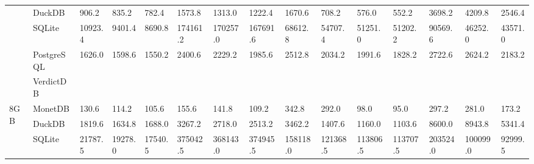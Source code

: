 \begin{table}[]
\begin{tabular}{ll|lllllllllllll}
                     & DuckDB     & 906.2                   & 835.2                   & 782.4                   & 1573.8                  & 1313.0                  & 1222.4                  & 1670.6                  & 708.2                   & 576.0                   & 552.2                   & 3698.2                  & 4209.8                  & 2546.4                  \\
                     & SQLite     & 10923.4                 & 9401.4                  & 8690.8                  & 174161.2                & 170257.0                & 167691.6                & 68612.8                 & 54707.4                 & 51251.0                 & 51202.2                 & 90569.6                 & 46252.0                 & 43571.0                 \\
                     & PostgreSQL & 1626.0                  & 1598.6                  & 1550.2                  & 2400.6                  & 2229.2                  & 1985.6                  & 2512.8                  & 2034.2                  & 1991.6                  & 1828.2                  & 2722.6                  & 2624.2                  & 2183.2                  \\
                     & VerdictDB  &                         &                         &                         &                         &                         &                         &                         &                         &                         &                         &                         &                         &                         \\ \hline
\multirow{5}{*}{8GB} & MonetDB    & 130.6                   & 114.2                   & 105.6                   & 155.6                   & 141.8                   & 109.2                   & 342.8                   & 292.0                   & 98.0                    & 95.0                    & 297.2                   & 281.0                   & 173.2                   \\
                     & DuckDB     & 1819.6                  & 1634.8                  & 1688.0                  & 3267.2                  & 2718.0                  & 2513.2                  & 3462.2                  & 1407.6                  & 1160.0                  & 1103.6                  & 8600.0                  & 8943.8                  & 5341.4                  \\
                     & SQLite     & 21787.5                 & 19278.0                 & 17540.5                 & 375042.5                & 368143.0                & 374945.5                & 158118.0                & 121368.5                & 113806.5                & 113707.5                & 203524.0                & 100099.0                & 92999.5                 \\

\end{tabular}
\end{table}
